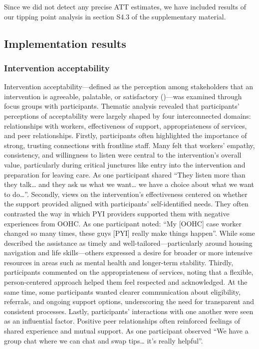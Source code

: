 \documentclass[
  jou,
  floatsintext,
  longtable,
  nolmodern,
  notxfonts,
  notimes,
  colorlinks=true,linkcolor=blue,citecolor=blue,urlcolor=blue]{apa7}
\begin{document}
Since we did not detect any precise ATT estimates, we have included
results of our tipping point analysis in section S4.3 of the
supplementary material.

\subsection{Implementation results}\label{implementation-results}

\subsubsection{Intervention
acceptability}\label{intervention-acceptability}

Intervention acceptability---defined as the perception among
stakeholders that an intervention is agreeable, palatable, or
satisfactory
()---was examined through focus groups with participants.
Thematic analysis revealed that participants' perceptions of
acceptability were largely shaped by four interconnected domains:
relationships with workers, effectiveness of support, appropriateness of
services, and peer relationships. Firstly, participants often
highlighted the importance of strong, trusting connections with
frontline staff. Many felt that workers' empathy, consistency, and
willingness to listen were central to the intervention's overall value,
particularly during critical junctures like entry into the intervention
and preparation for leaving care. As one participant shared ``They
listen more than they talk\ldots{} and they ask us what we want\ldots{}
we have a choice about what we want to do\ldots{}''. Secondly, views on
the intervention's effectiveness centered on whether the support
provided aligned with participants' self-identified needs. They often
contrasted the way in which PYI providers supported them with negative
experiences from OOHC. As one participant noted: ``My {[}OOHC{]} case
worker changed so many times, these guys {[}PYI{]} really make things
happen''. While some described the assistance as timely and
well-tailored---particularly around housing navigation and life
skills---others expressed a desire for broader or more intensive
resources in areas such as mental health and longer-term stability.
Thirdly, participants commented on the appropriateness of services,
noting that a flexible, person-centered approach helped them feel
respected and acknowledged. At the same time, some participants wanted
clearer communication about eligibility, referrals, and ongoing support
options, underscoring the need for transparent and consistent processes.
Lastly, participants' interactions with one another were seen as an
influential factor. Positive peer relationships often reinforced
feelings of shared experience and mutual support. As one participant
observed ``We have a group chat where we can chat and swap tips\ldots{}
it's really helpful''.
\end{document}
